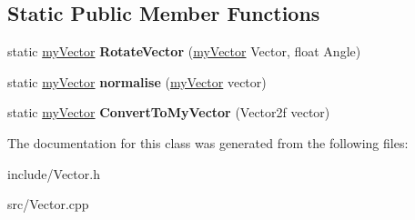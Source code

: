 \subsection*{Static Public Member Functions}
\begin{DoxyCompactItemize}
\item 
\hypertarget{classmy_vector_a637dbf4f6f8ace8798907508cc7dc694}{}static \hyperlink{classmy_vector}{my\+Vector} {\bfseries Rotate\+Vector} (\hyperlink{classmy_vector}{my\+Vector} Vector, float Angle)\label{classmy_vector_a637dbf4f6f8ace8798907508cc7dc694}

\item 
\hypertarget{classmy_vector_aad23cd26628305a6a0b470a3650c326b}{}static \hyperlink{classmy_vector}{my\+Vector} {\bfseries normalise} (\hyperlink{classmy_vector}{my\+Vector} vector)\label{classmy_vector_aad23cd26628305a6a0b470a3650c326b}

\item 
\hypertarget{classmy_vector_a19b37337f80ec19c1c70cd4e5d8ade14}{}static \hyperlink{classmy_vector}{my\+Vector} {\bfseries Convert\+To\+My\+Vector} (Vector2f vector)\label{classmy_vector_a19b37337f80ec19c1c70cd4e5d8ade14}

\end{DoxyCompactItemize}


The documentation for this class was generated from the following files\+:\begin{DoxyCompactItemize}
\item 
include/Vector.\+h\item 
src/Vector.\+cpp\end{DoxyCompactItemize}
